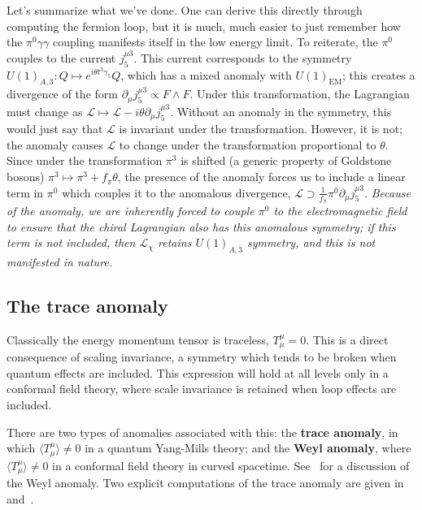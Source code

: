 \documentclass[11pt, oneside]{article}   	%
\theoremstyle{definition}
\numberwithin{equation}{subsection}		%
\begin{document}
Let's summarize what we've done. One can derive this directly through computing the fermion loop, but it is much, much 
easier to just remember how the $\pi^0\gamma\gamma$ coupling manifests itself in the low energy limit. To reiterate, the $\pi^0$ couples to the 
current $j_5^{\mu 3}$. This current corresponds to the symmetry $U(1)_{A, 3} : Q\mapsto e^{i\theta t^3\gamma_5} Q$, which has a mixed anomaly 
with $U(1)_\mathrm{EM}$; this creates a divergence of the form $\partial_\mu j_5^{\mu 3}\propto F\wedge F$. Under this transformation, the 
Lagrangian must change as $\mathcal L\mapsto \mathcal L - i\theta\partial_\mu j_5^{\mu 3}$. Without an anomaly in the symmetry, this would 
just say that $\mathcal L$ is invariant under the transformation. However, it is not; the anomaly causes $\mathcal L$ to change under the 
transformation proportional to $\theta$. Since under the transformation $\pi^3$ is shifted (a generic property of Goldstone bosons) 
$\pi^3\mapsto \pi^3 + f_\pi\theta$, the presence of the anomaly forces us to include a linear term in $\pi^0$ which couples it to the anomalous 
divergence, $\mathcal L\supset \frac{1}{f_\pi} \pi^0\partial_\mu j_5^{\mu 3}$. \textit{Because of the anomaly, we are inherently forced to couple 
$\pi^0$ to the electromagnetic field to ensure that the chiral Lagrangian also has this anomalous symmetry; if this term is not 
included, then $\mathcal L_\chi$ retains $U(1)_{A, 3}$ symmetry, and this is not manifested in nature.}

\subsection{The trace anomaly}
\label{subsec:trace}

Classically the energy momentum tensor is traceless, $T_\mu^\mu = 0$. This is a direct consequence of scaling invariance, 
a symmetry which tends to be broken when quantum effects are included. This expression will hold at all levels only in a 
conformal field theory, where scale invariance is retained when loop effects are included. 

There are two types of anomalies associated with this: the \textbf{trace anomaly}, in which $\langle T_\mu^\mu\rangle\neq 0$ 
in a quantum Yang-Mills theory; and the \textbf{Weyl anomaly}, where $\langle T_\mu^\mu\rangle\neq 0$ in a conformal field 
theory in curved spacetime. See~\cite{tong_cft} for a discussion of the Weyl anomaly. 
Two explicit computations of the trace anomaly are given in~\cite{trace_anomaly1} and~\cite{trace_anomaly2}.
\end{document}
